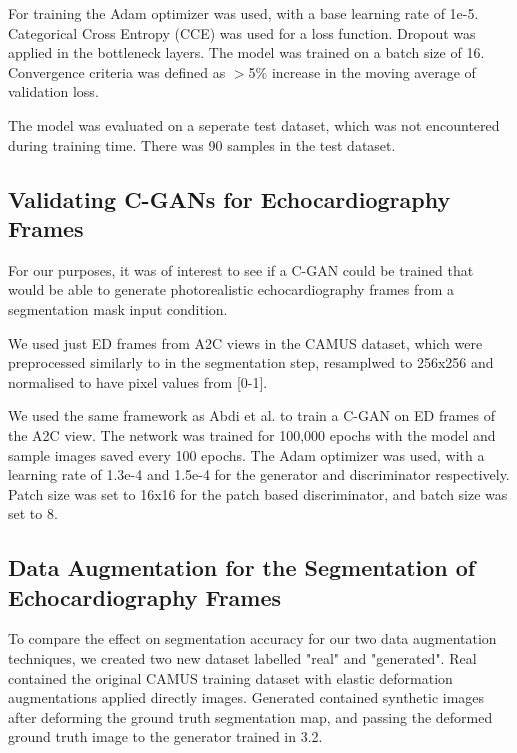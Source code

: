 For training the Adam optimizer was used, with a base learning rate of 1e-5.
Categorical Cross Entropy (CCE) was used for a loss function. Dropout was
applied in the bottleneck layers. The model was trained on a batch size of 16.
Convergence criteria was defined as $>$5\% increase in the moving average of
validation loss. \newline

The model was evaluated on a seperate test dataset, which was not encountered
during training time. There was 90 samples in the test dataset. \newline

\subsection{Validating C-GANs for Echocardiography Frames}

For our purposes, it was of interest to see if a C-GAN could be trained that
would be able to generate photorealistic echocardiography frames from a
segmentation mask input condition. \newline

We used just ED frames from A2C views in the CAMUS dataset, which were
preprocessed similarly to in the segmentation step, resamplwed to 256x256 and
normalised to have pixel values from [0-1]. \newline

We used the same framework as Abdi et al. to train a C-GAN on ED frames of the
A2C view. The network was trained for 100,000 epochs with the model and
sample images saved every 100 epochs. The Adam optimizer was used, with a
learning rate of 1.3e-4 and 1.5e-4 for the generator and discriminator
respectively. Patch size was set to 16x16 for the patch based discriminator, and
batch size was set to 8.\newline

\subsection{Data Augmentation for the Segmentation of Echocardiography Frames}

To compare the effect on segmentation accuracy for our two data augmentation
techniques, we created two new dataset labelled "real" and "generated". Real
contained the original CAMUS training dataset with elastic deformation
augmentations applied directly images. Generated contained synthetic images
after deforming the ground truth segmentation map, and passing the deformed
ground truth image to the generator trained in 3.2.
\newline

